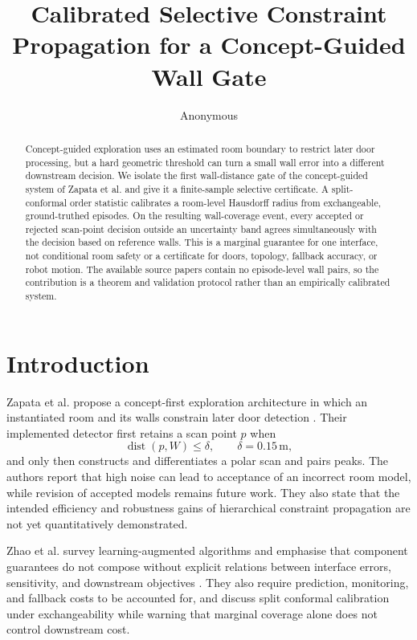 \documentclass{article}
\title{Calibrated Selective Constraint Propagation for a Concept-Guided Wall Gate}
\author{Anonymous}
\date{}
\DeclareMathOperator{\dist}{dist}
\begin{document}
\maketitle

\begin{abstract}
Concept-guided exploration uses an estimated room boundary to restrict later door processing, but a hard geometric threshold can turn a small wall error into a different downstream decision. We isolate the first wall-distance gate of the concept-guided system of Zapata et al. and give it a finite-sample selective certificate. A split-conformal order statistic calibrates a room-level Hausdorff radius from exchangeable, ground-truthed episodes. On the resulting wall-coverage event, every accepted or rejected scan-point decision outside an uncertainty band agrees simultaneously with the decision based on reference walls. This is a marginal guarantee for one interface, not conditional room safety or a certificate for doors, topology, fallback accuracy, or robot motion. The available source papers contain no episode-level wall pairs, so the contribution is a theorem and validation protocol rather than an empirically calibrated system.
\end{abstract}

\section{Introduction}

Zapata et al. propose a concept-first exploration architecture in which an instantiated room and its walls constrain later door detection \cite{zapata2026concept}. Their implemented detector first retains a scan point $p$ when
\begin{equation}
  \dist(p,W) \leq \delta, \qquad \delta=0.15\,\mathrm{m},
  \label{eq:gate}
\end{equation}
and only then constructs and differentiates a polar scan and pairs peaks. The authors report that high noise can lead to acceptance of an incorrect room model, while revision of accepted models remains future work. They also state that the intended efficiency and robustness gains of hierarchical constraint propagation are not yet quantitatively demonstrated.

Zhao et al. survey learning-augmented algorithms and emphasise that component guarantees do not compose without explicit relations between interface errors, sensitivity, and downstream objectives \cite{zhao2026learning}. They also require prediction, monitoring, and fallback costs to be accounted for, and discuss split conformal calibration under exchangeability while warning that marginal coverage alone does not control downstream cost.
\end{document}
